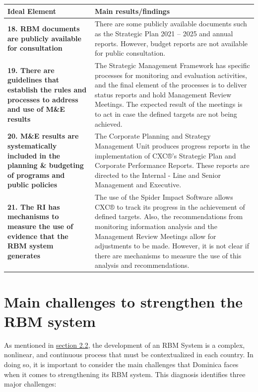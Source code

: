 \documentclass[
  10pt,
]{book}
\begin{document}
\begin{tabu} to 
\hline
Ideal Element & Main results/findings\\
\hline
\textbf{18. RBM documents are publicly available for consultation} & There are some publicly available documents such as the Strategic Plan 2021 – 2025 and annual reports. However, budget reports are not available for public consultation.\\
\hline
\textbf{19. There are guidelines that establish the rules and processes to address and use of M\&E results} & The Strategic Management Framework has specific processes for monitoring and evaluation activities, and the final element of the processes is to deliver status reports and hold Management Review Meetings. The expected result of the meetings is to act in case the defined targets are not being achieved.\\
\hline
\textbf{20. M\&E results are systematically included in the planning \& budgeting of programs and public policies} & The Corporate Planning and Strategy Management Unit produces progress reports in the implementation of CXC®’s Strategic Plan and Corporate Performance Reports. These reports are directed to the Internal - Line and Senior Management and Executive.\\
\hline
\textbf{21. The RI has mechanisms to measure the use of evidence that the RBM system generates} & The use of the  Spider Impact Software allows CXC® to track its progress in the achievement of defined targets. Also, the recommendations from monitoring information analysis and the Management Review Meetings allow for adjustments to be made. However, it is not clear if there are mechanisms to measure the use of this analysis and recommendations.\\
\hline
\end{tabu}
\endgroup{}

\hypertarget{main-challenges-to-strengthen-the-rbm-system}{%
\section{Main challenges to strengthen the RBM system}\label{main-challenges-to-strengthen-the-rbm-system}}

As mentioned in \protect\hyperlink{section2}{section 2.2}, the development of an RBM System is a complex, nonlinear, and continuous process that must be contextualized in each country. In doing so, it is important to consider the main challenges that Dominica faces when it comes to strengthening its RBM system. This diagnosis identifies three major challenges:
\end{document}
